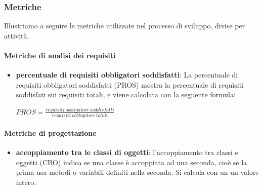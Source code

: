 			
			
			
	\subsubsection{Metriche}
	Illustriamo a seguire le metriche utilizzate nel processo di sviluppo, divise per attività.
		\paragraph{Metriche di analisi dei requisiti}
		\begin{itemize}
			\item \textbf{percentuale di requisiti obbligatori soddisfatti}:
			La percentuale di requisiti obbligatori soddisfatti (PROS) mostra la percentuale di requisiti soddisfati sui requisiti totali, e viene calcolata con la seguente formula:	
			\begin{center}
				$ PROS = \frac{requisiti\ obbligatori\ soddisfatti}{requisiti\ obbligatori\ totali}$
			\end{center}		
		\end{itemize}		
		\paragraph{Metriche di progettazione}
		\begin{itemize}
			\item \textbf{accoppiamento tra le classi di oggetti}:
			l'accoppiamento tra classi e oggetti (CBO) indica se una classe è accoppiata ad una seconda, cioè se la prima usa metodi o variabili definiti nella seconda. Si calcola con un un valore intero.
		\end{itemize}
